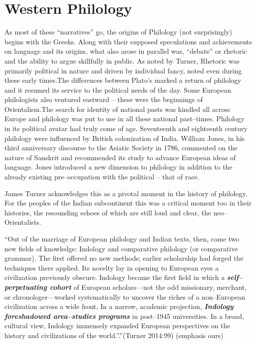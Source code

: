 \section*{Western Philology}

As most of these “narratives” go, the origins of Philology (not surprisingly) begins with the Greeks. Along with their supposed speculations and achievements on language and its origins, what also arose in parallel was, “debate” or rhetoric and the ability to argue skillfully in public. As noted by Turner, Rhetoric was primarily political in nature and driven by individual fancy, noted even during these early times.The differences between Plato’s marked a return of philology and it resumed its service to the political needs of the day. Some European philologists also ventured eastward – these were the beginnings of Orientalism.The search for identity of national pasts was kindled all across Europe and philology was put to use in all these national past–times. Philology in its political avatar had truly come of age. Seventeenth and eighteenth century philology were influenced by British colonization of India. William Jones, in his third anniversary discourse to the Asiatic Society in 1786, commented on the nature of Sanskrit and recommended its study to advance European ideas of language. Jones introduced a new dimension to philology in addition to the already existing pre–occupation with the political – that of race.

James Turner acknowledges this as a pivotal moment in the history of philology. For the peoples of the Indian subcontinent this was a critical moment too in their histories, the resounding echoes of which are still loud and clear, the neo–Orientalists.

\begin{myquote}
“Out of the marriage of European philology and Indian texts, then, came two new fields of knowledge: Indology and comparative philology (or comparative grammar). The first offered no new methods; earlier scholarship had forged the techniques there applied. Its novelty lay in opening to European eyes a civilization previously obscure. Indology became the first field in which a \textbf{\textit{self–perpetuating cohort}} of European scholars—not the odd missionary, merchant, or chronologer—worked systematically to uncover the riches of a non–European civilization across a wide front. In a narrow, academic projection, \textbf{\textit{Indology foreshadowed area–studies programs}} in post–1945 universities. In a broad, cultural view, Indology immensely expanded European perspectives on the history and civilizations of the world.”.”\hfill (Turner 2014:99) (emphasis ours)
\end{myquote}

